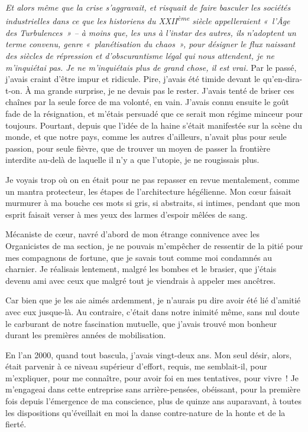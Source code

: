 \documentclass[
  extrafontsizes,
  oneside,
  14pt
]{memoir}
\begin{document}
\emph{Et alors même que la crise s'aggravait, et risquait de faire
basculer les sociétés industrielles dans ce que les historiens du
XXII\textsuperscript{ème} siècle appelleraient «~l'Âge des Turbulences~» -- à
moins que, les uns à l'instar des autres, ils n'adoptent un terme convenu,
genre «~planétisation du chaos~», pour désigner le flux naissant des siècles de
répression et d'obscurantisme légal qui nous attendent, je ne m'inquiétai pas.
Je ne m'inquiétais plus de grand chose, il est vrai.} Par le passé, j'avais
craint d'être impur et ridicule. Pire, j'avais été timide devant le
qu'en-dira-t-on. À ma grande surprise, je ne devais pas le rester. J'avais
tenté de briser ces chaînes par la seule force de ma volonté, en vain. J'avais
connu ensuite le goût fade de la résignation, et m'étais persuadé que ce serait
mon régime minceur pour toujours. Pourtant, depuis que l'idée de la haine
s'était manifestée sur la scène du monde, et que notre pays, comme les autres
d'ailleurs, n'avait plus pour seule passion, pour seule fièvre, que de trouver
un moyen de passer la frontière interdite au-delà de laquelle il n'y a que
l'utopie, je ne rougissais plus.

Je voyais trop où on en était pour ne pas repasser en revue mentalement,
comme un mantra protecteur, les étapes de l'architecture hégélienne. Mon
cœur faisait murmurer à ma bouche ces mots si gris, si abstraits, si
intimes, pendant que mon esprit faisait verser à mes yeux des larmes
d'espoir mêlées de sang.

Mécaniste de cœur, navré d'abord de mon étrange connivence avec les
Organicistes de ma section, je ne pouvais m'empêcher de ressentir de la
pitié pour mes compagnons de fortune, que je savais tout comme moi
condamnés au charnier. Je réalisais lentement, malgré les bombes et le
brasier, que j'étais devenu ami avec ceux que malgré tout je viendrais à
appeler mes ancêtres.

Car bien que je les aie aimés ardemment, je n'aurais pu dire avoir été
lié d'amitié avec eux jusque-là. Au contraire, c'était dans notre
inimité même, sans nul doute le carburant de notre fascination mutuelle,
que j'avais trouvé mon bonheur durant les premières années de
mobilisation.

En l'an 2000, quand tout bascula, j'avais vingt-deux ans. Mon seul
désir, alors, était parvenir à ce niveau supérieur d'effort, requis, me
semblait-il, pour m'expliquer, pour me connaître, pour avoir foi en mes
tentatives, pour vivre~! Je m'engageai dans cette entreprise sans
arrière-pensées, obéissant, pour la première fois depuis l'émergence de
ma conscience, plus de quinze ans auparavant, à toutes les dispositions
qu'éveillait en moi la danse contre-nature de la honte et de la fierté.
\end{document}
